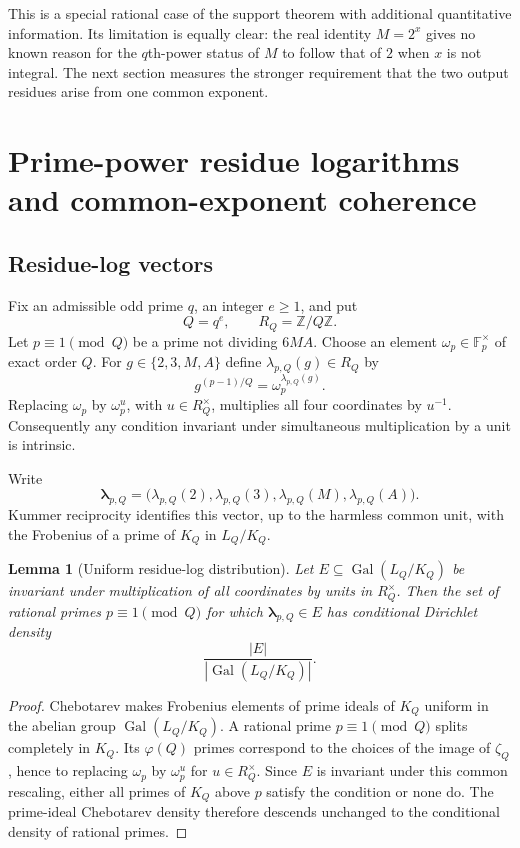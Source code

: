\documentclass[11pt]{article}
\newtheorem{lemma}[theorem]{Lemma}
\theoremstyle{definition}
\theoremstyle{remark}
\newcommand{\Z}{\mathbb{Z}}
\newcommand{\F}{\mathbb{F}}
\newcommand{\Gal}{\operatorname{Gal}}
\begin{document}
This is a special rational case of the support theorem with additional quantitative information.
Its limitation is equally clear: the real identity $M=2^x$ gives no known reason for the
$q$th-power status of $M$ to follow that of $2$ when $x$ is not integral.  The next section
measures the stronger requirement that the two output residues arise from one common exponent.

\section{Prime-power residue logarithms and common-exponent coherence}
\label{sec:coherence}

\subsection{Residue-log vectors}

Fix an admissible odd prime $q$, an integer $e\ge1$, and put
\[
      Q=q^e,\qquad R_Q=\Z/Q\Z.
\]
Let $p\equiv1\pmod Q$ be a prime not dividing $6MA$.  Choose an element
$\omega_p\in\F_p^\times$ of exact order $Q$.  For $g\in\{2,3,M,A\}$ define
$\lambda_{p,Q}(g)\in R_Q$ by
\[
        g^{(p-1)/Q}=\omega_p^{\lambda_{p,Q}(g)}.
        \tag{4.1}\label{eq:reslog}
\]
Replacing $\omega_p$ by $\omega_p^u$, with $u\in R_Q^\times$, multiplies all four
coordinates by $u^{-1}$.  Consequently any condition invariant under simultaneous multiplication
by a unit is intrinsic.

Write
\[
 \bm\lambda_{p,Q}
 =\bigl(\lambda_{p,Q}(2),\lambda_{p,Q}(3),
        \lambda_{p,Q}(M),\lambda_{p,Q}(A)\bigr).
\]
Kummer reciprocity identifies this vector, up to the harmless common unit, with the Frobenius
of a prime of $K_Q$ in $L_Q/K_Q$.

\begin{lemma}[Uniform residue-log distribution]\label{lem:uniform}
Let $E\subseteq\Gal(L_Q/K_Q)$ be invariant under multiplication of all coordinates by units in
$R_Q^\times$.  Then the set of rational primes $p\equiv1\pmod Q$ for which
$\bm\lambda_{p,Q}\in E$ has conditional Dirichlet density
\[
       \frac{|E|}{|\Gal(L_Q/K_Q)|}.
\]
\end{lemma}
\begin{proof}
Chebotarev makes Frobenius elements of prime ideals of $K_Q$ uniform in the abelian group
$\Gal(L_Q/K_Q)$.  A rational prime $p\equiv1\pmod Q$ splits completely in $K_Q$.  Its
$\varphi(Q)$ primes correspond to the choices of the image of $\zeta_Q$, hence to replacing
$\omega_p$ by $\omega_p^u$ for $u\in R_Q^\times$.  Since $E$ is invariant under this common
rescaling, either all primes of $K_Q$ above $p$ satisfy the condition or none do.  The prime-ideal
Chebotarev density therefore descends unchanged to the conditional density of rational primes.
\end{proof}
\end{document}
